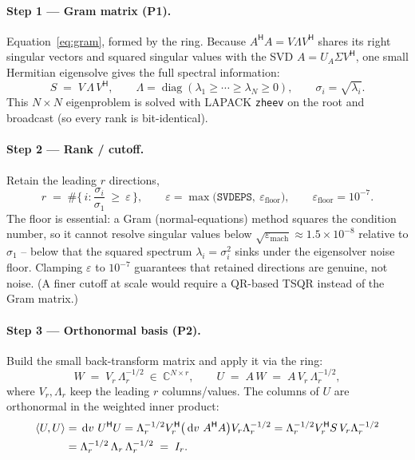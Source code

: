 \documentclass[11pt]{article}
\newcommand{\dv}{\,\mathrm{d}v\,}
\newcommand{\Herm}{^{\mathsf{H}}}
\begin{document}
\paragraph{Step 1 --- Gram matrix (P1).} Equation~\eqref{eq:gram}, formed by the
ring. Because $A\Herm A = V\Lambda V\Herm$ shares its right singular vectors and
squared singular values with the SVD $A=U_{\!A}\Sigma V\Herm$, one small
Hermitian eigensolve gives the full spectral information:
\begin{equation}
  S \;=\; V\,\Lambda\,V\Herm,\qquad
  \Lambda=\operatorname{diag}(\lambda_1\ge\cdots\ge\lambda_N\ge 0),\qquad
  \sigma_i=\sqrt{\lambda_i}.
  \label{eq:eig}
\end{equation}
This $N\!\times\!N$ eigenproblem is solved with LAPACK \texttt{zheev} on the
root and broadcast (so every rank is bit-identical).

\paragraph{Step 2 --- Rank / cutoff.} Retain the leading $r$ directions,
\begin{equation}
  r \;=\; \#\Big\{\, i : \frac{\sigma_i}{\sigma_1}\ \ge\ \varepsilon \,\Big\},
  \qquad
  \varepsilon=\max\!\big(\texttt{SVDEPS},\ \varepsilon_{\mathrm{floor}}\big),
  \qquad
  \varepsilon_{\mathrm{floor}}=10^{-7}.
  \label{eq:cutoff}
\end{equation}
The floor is essential: a Gram (normal-equations) method squares the condition
number, so it cannot resolve singular values below
$\sqrt{\varepsilon_{\mathrm{mach}}}\approx1.5\times10^{-8}$ relative to
$\sigma_1$ -- below that the squared spectrum $\lambda_i=\sigma_i^2$ sinks under
the eigensolver noise floor. Clamping $\varepsilon$ to $10^{-7}$ guarantees that
retained directions are genuine, not noise. (A finer cutoff at scale would
require a QR-based TSQR instead of the Gram matrix.)

\paragraph{Step 3 --- Orthonormal basis (P2).} Build the small back-transform
matrix and apply it via the ring:
\begin{equation}
  W \;=\; V_r\,\Lambda_r^{-1/2}\ \in\ \mathbb{C}^{N\times r},
  \qquad
  U \;=\; A\,W \;=\; A\,V_r\,\Lambda_r^{-1/2},
  \label{eq:U}
\end{equation}
where $V_r,\Lambda_r$ keep the leading $r$ columns/values. The columns of $U$
are orthonormal in the weighted inner product:
\begin{align}
  \langle U,U\rangle
  &= \dv\,U\Herm U
   = \Lambda_r^{-1/2} V_r\Herm \big(\dv\,A\Herm A\big) V_r \Lambda_r^{-1/2}
   = \Lambda_r^{-1/2} V_r\Herm S\, V_r \Lambda_r^{-1/2} \notag\\
  &= \Lambda_r^{-1/2}\,\Lambda_r\,\Lambda_r^{-1/2} \;=\; I_r .
  \label{eq:orthoproof}
\end{align}
\end{document}
